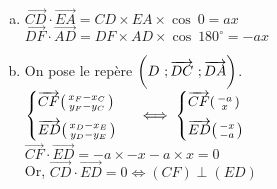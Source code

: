 \documentclass[12pt, a4paper]{article}
\begin{document}
\begin{Exercise}[number={81}]
  \begin{enumerate}[a)]
    \item $\overrightarrow{CD}\cdot\overrightarrow{EA}=CD\times EA\times\cos{\ 0}=ax$ \\ $\overrightarrow{DF}\cdot\overrightarrow{AD}=DF\times AD\times\cos{\ 180^{\circ}}=-ax$
    \item On pose le repère $\delimiterfactor=1200\left(D\ ;\overrightarrow{DC}\ ;\overrightarrow{DA}\right)$.\medskip \\ 
          $\begin{cases}\overrightarrow{CF}\begin{psmallmatrix}x_F-x_C\\y_F-y_C\end{psmallmatrix}\\[0.2cm]\overrightarrow{ED}\begin{psmallmatrix}x_D-x_E\\y_D-y_E\end{psmallmatrix}\end{cases}$ 
          $\iff \begin{cases}\overrightarrow{CF}\begin{psmallmatrix}-a\\x\end{psmallmatrix}\\[0.2cm]\overrightarrow{ED}\begin{psmallmatrix}-x\\-a\end{psmallmatrix}\end{cases}$ \medskip \\
          $\overrightarrow{CF}\cdot\overrightarrow{ED}=-a\times-x-a\times x=0$ \smallskip \\
          Or, \quad $\overrightarrow{CD}\cdot\overrightarrow{ED}=0\iff(CF)\perp(ED)$
  \end{enumerate}
\end{Exercise}
\end{document}
